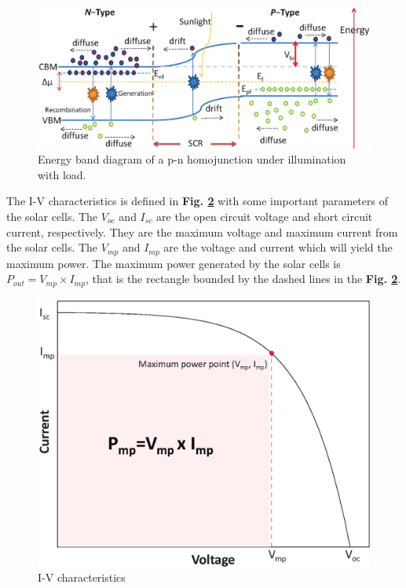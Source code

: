 \documentclass[a4paper, 12pt, titlepage,oneside,drop]{kthesis}
\begin{document}
\begin{figure}[H]
\centering
\includegraphics[scale=0.45]{illumination1.eps}
\caption{Energy band diagram of a p-n homojunction under illumination with load.}
\label{illu1}
\end{figure}


The I-V characteristics is defined in \textbf{Fig. \ref{ivcharac}} with some important parameters of the solar cells. The $V_{oc}$ and $I_{sc}$ are the open circuit voltage and short circuit current, respectively. 
They are the maximum voltage and maximum current from the solar cells. The $V_{mp}$ and $I_{mp}$ are the voltage and current which will yield the maximum power. The maximum power generated by the solar cells is $P_{out}=V_{mp} \times I_{mp}$, that is the rectangle bounded by the dashed lines in the 
\textbf{Fig. \ref{ivcharac}}. 

\begin{figure}[H]
\centering
\includegraphics[scale=0.5]{IV.eps}
\caption{I-V characteristics}
\label{ivcharac}
\end{figure}
\end{document}
